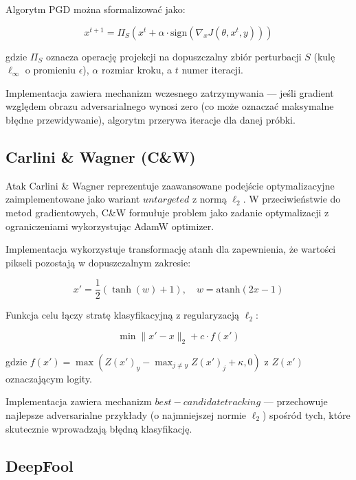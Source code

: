 \documentclass[12pt]{article}
\begin{document}
Algorytm PGD można sformalizować jako:

\begin{equation}
    x^{t+1} = \Pi_{S}(x^t + \alpha \cdot \text{sign}(\nabla_x J(\theta, x^t, y)))
\end{equation}

gdzie $\Pi_{S}$ oznacza operację projekcji na dopuszczalny zbiór perturbacji $S$ (kulę $\ell_\infty$ o promieniu $\epsilon$), $\alpha$ rozmiar kroku, a $t$ numer iteracji.

Implementacja zawiera mechanizm wczesnego zatrzymywania --- jeśli gradient względem obrazu adversarialnego wynosi zero (co może oznaczać maksymalne błędne przewidywanie), algorytm przerywa iteracje dla danej próbki.

\subsection{Carlini \& Wagner (C\&W)}

Atak Carlini \& Wagner \supercite{carlini2017towards} reprezentuje zaawansowane podejście optymalizacyjne zaimplementowane jako wariant $untargeted$ z normą $\ell_2$. W przeciwieństwie do metod gradientowych, C\&W formułuje problem jako zadanie optymalizacji z ograniczeniami wykorzystując AdamW optimizer.

Implementacja wykorzystuje transformację atanh dla zapewnienia, że wartości pikseli pozostają w dopuszczalnym zakresie:

\begin{equation}
    x' = \frac{1}{2}(\tanh(w) + 1), \quad w = \text{atanh}(2x - 1)
\end{equation}

Funkcja celu łączy stratę klasyfikacyjną z regularyzacją $\ell_2$:

\begin{equation}
    \min \|x' - x\|_2 + c \cdot f(x')
\end{equation}

gdzie $f(x') = \max(Z(x')_{y} - \max_{j \neq y} Z(x')_j + \kappa, 0)$ z $Z(x')$ oznaczającym logity.

Implementacja zawiera mechanizm $best-candidate tracking$ --- przechowuje najlepsze adversarialne przykłady (o najmniejszej normie $\ell_2$) spośród tych, które skutecznie wprowadzają błędną klasyfikację.

\subsection{DeepFool}
\end{document}
